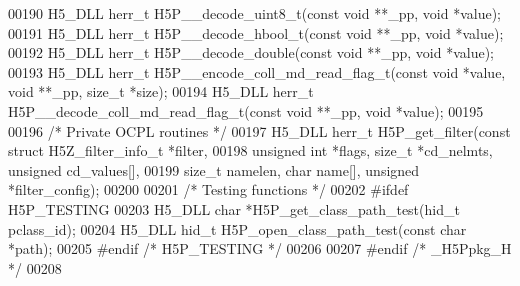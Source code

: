 \begin{DoxyCode}
00190 H5\_DLL herr\_t H5P\_\_decode\_uint8\_t(\textcolor{keyword}{const} \textcolor{keywordtype}{void} **\_pp, \textcolor{keywordtype}{void} *value);
00191 H5\_DLL herr\_t H5P\_\_decode\_hbool\_t(\textcolor{keyword}{const} \textcolor{keywordtype}{void} **\_pp, \textcolor{keywordtype}{void} *value);
00192 H5\_DLL herr\_t H5P\_\_decode\_double(\textcolor{keyword}{const} \textcolor{keywordtype}{void} **\_pp, \textcolor{keywordtype}{void} *value);
00193 H5\_DLL herr\_t H5P\_\_encode\_coll\_md\_read\_flag\_t(\textcolor{keyword}{const} \textcolor{keywordtype}{void} *value, \textcolor{keywordtype}{void} **\_pp, \textcolor{keywordtype}{size\_t} *size);
00194 H5\_DLL herr\_t H5P\_\_decode\_coll\_md\_read\_flag\_t(\textcolor{keyword}{const} \textcolor{keywordtype}{void} **\_pp, \textcolor{keywordtype}{void} *value);
00195 
00196 \textcolor{comment}{/* Private OCPL routines */}
00197 H5\_DLL herr\_t H5P\_get\_filter(\textcolor{keyword}{const} \textcolor{keyword}{struct} H5Z\_filter\_info\_t *filter,
00198     \textcolor{keywordtype}{unsigned} \textcolor{keywordtype}{int} *flags, \textcolor{keywordtype}{size\_t} *cd\_nelmts, \textcolor{keywordtype}{unsigned} cd\_values[],
00199     \textcolor{keywordtype}{size\_t} namelen, \textcolor{keywordtype}{char} name[], \textcolor{keywordtype}{unsigned} *filter\_config);
00200 
00201 \textcolor{comment}{/* Testing functions */}
00202 \textcolor{preprocessor}{#ifdef H5P\_TESTING}
00203 H5\_DLL \textcolor{keywordtype}{char} *H5P\_get\_class\_path\_test(hid\_t pclass\_id);
00204 H5\_DLL hid\_t H5P\_open\_class\_path\_test(\textcolor{keyword}{const} \textcolor{keywordtype}{char} *path);
00205 \textcolor{preprocessor}{#endif }\textcolor{comment}{/* H5P\_TESTING */}\textcolor{preprocessor}{}
00206 
00207 \textcolor{preprocessor}{#endif }\textcolor{comment}{/* \_H5Ppkg\_H */}\textcolor{preprocessor}{}
00208 
\end{DoxyCode}
